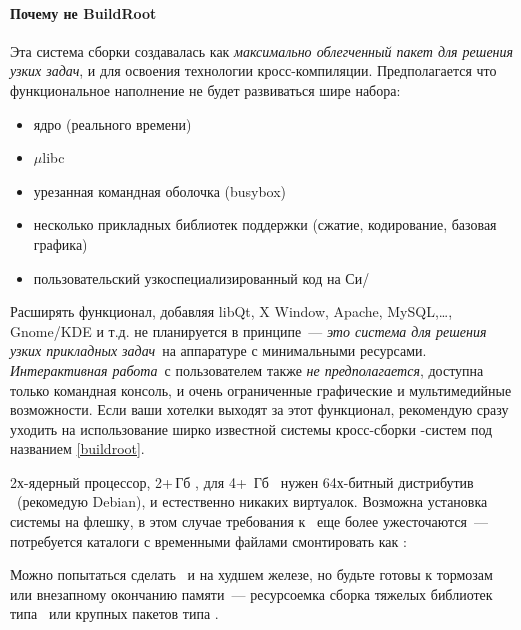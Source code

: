 \paragraph{Почему не BuildRoot}

Эта система сборки создавалась как \emph{максимально облегченный пакет
для решения узких задач}, и для освоения технологии кросс-компиляции.
Предполагается что функциональное наполнение не будет развиваться шире набора:

\begin{itemize}[nosep]
  \item ядро (реального времени)
  \item $\mu$libc
  \item урезанная командная оболочка (busybox)
  \item несколько прикладных библиотек поддержки (сжатие, кодирование, базовая
  графика)
  \item пользовательский узкоспециализированный код на Си/\cpp
\end{itemize}

Расширять функционал, добавляя libQt, X Window, Apache, MySQL,\ldots, Gnome/KDE
и т.д. не планируется в принципе\ --- \emph{это система для решения узких
прикладных задач}\ на аппаратуре с минимальными ресурсами. \emph{Интерактивная работа}\ с пользователем также
\emph{не предполагается}, доступна только командная консоль, и очень ограниченные графические и мультимедийные
возможности. Если ваши хотелки выходят за этот функционал, рекомендую сразу
уходить на использование ширко известной системы кросс-сборки \linux-систем под
названием \ref{buildroot}.


2х-ядерный процессор, 2+\,Гб \ram, для 4+\, Гб \ram\ нужен 64х-битный
дистрибутив \linux\ (рекомедую Debian), и естественно никаких виртуалок.
Возможна установка системы на флешку, в этом случае требования к \ram\ еще более
ужесточаются\ --- потребуется каталоги с временными файлами смонтировать как
:



Можно попытаться сделать \ и на худшем железе, но будьте
готовы к тормозам или внезапному окончанию памяти\ --- ресурсоемка сборка
тяжелых библиотек типа \ или крупных пакетов типа .

